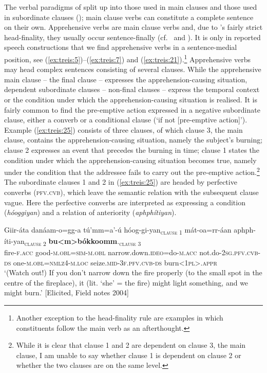\documentclass[output=paper,colorlinks,citecolor=brown,]{langscibook}
\begin{document}
The verbal paradigms of  split up into those used in main clauses and those used in subordinate clauses (); main clause verbs can constitute a complete sentence on their own. Apprehensive verbs are main clause verbs and, due to 's fairly strict head-finality, they usually occur sentence-finally (cf.\   and ). It is only in reported speech constructions that we find apprehensive verbs in a sentence-medial position, see (\ref{ex:treis:5})--(\ref{ex:treis:7}) and (\ref{ex:treis:21}).\footnote{Another exception to the head-finality rule are examples in which constituents follow the main verb as an afterthought.} Apprehensive verbs may head complex sentences consisting of several clauses. While the apprehensive main clause -- the final clause -- expresses the apprehension-causing situation, dependent subordinate clauses -- non-final clauses -- express the temporal context or the condition under which the apprehension-causing situation is realised. It is fairly common to find the pre-emptive action expressed in a negative subordinate clause, either a converb or a conditional clause (`if not [pre-emptive action]').
Example (\ref{ex:treis:25}) consists of three clauses, of which clause 3, the main clause, contains the apprehension-causing situation, namely the subject's burning; clause 2 expresses an event that precedes the burning in time; clause 1 states the condition under which the apprehension-causing situation becomes true, namely under the condition that the addressee fails to carry out the pre-emptive action.\footnote{While it is clear that clause 1 and 2 are dependent on clause 3, the main clause, I am unable to say whether clause 1 is dependent on clause 2 or whether the two clauses are on the same level.} The subordinate clauses 1 and 2 in (\ref{ex:treis:25}) are headed by perfective converbs (\textsc{pfv.cvb}), which leave the semantic relation with the subsequent clause vague. Here the perfective converbs are interpreted as expressing a condition (\textit{hóoggiyan}) and a relation of anteriority (\textit{aphphítiyan}). 

\ea\label{ex:treis:25} 
\gll {\ob}Giir-áta  	danáam-o=gg-a 			tú'mm=a'-ú hóog-gi-yan{\cb}\textsubscript{\textnormal{\textsc{clause 1}}}		{\ob}mát-oa=rr-áan				aphph-íti-yan{\cb}\textsubscript{\textnormal{\textsc{clause 2}}} {\ob}\textbf{bu<m>bókkoomm}.{\cb}\textsubscript{\textnormal{\textsc{clause 3}}}\\
\hphantom{[}fire-\textsc{f.acc}	good-\textsc{m.obl=sim-m.obl}	narrow.down.\textsc{ideo}=do-\textsc{m.acc} not.do-\textsc{2sg.pfv.cvb-ds} \hphantom{[}one-\textsc{m.obl=nmlz4-m.loc} seize.\textsc{mid-3f.pfv.cvb-ds} \hphantom{[}burn\textsc{<1pl>.appr}\\
\glt `(Watch out!) If you don't narrow down the fire properly (to the small spot in the centre of the fireplace), it (lit. `she' = the fire) might light something, and we might burn.'  [Elicited, Field notes 2004]
\z 
\end{document}
